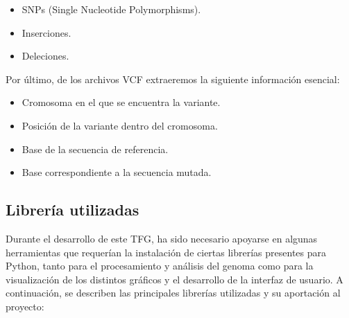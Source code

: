 \documentclass[11pt,spanish,listoffigures,listoftables]{tfgetsinf}
\begin{document}
\begin{itemize}
   \item SNPs (Single Nucleotide Polymorphisms). 
   \item Inserciones. 
   \item Deleciones.
\end{itemize}

Por último, de los archivos VCF extraeremos la siguiente información esencial: 

\begin{itemize}
   \item Cromosoma en el que se encuentra la variante.
   \item Posición de la variante dentro del cromosoma.  
   \item Base de la secuencia de referencia.
   \item Base correspondiente a la secuencia mutada.
\end{itemize}
 

\subsection{Librería utilizadas}

Durante el desarrollo de este TFG, ha sido necesario apoyarse en algunas herramientas que requerían la instalación de ciertas librerías presentes para Python, tanto para el procesamiento y análisis del genoma como para la visualización de los distintos gráficos y el desarrollo de la interfaz de usuario. A continuación, se describen las principales librerías utilizadas y su aportación al proyecto:
\end{document}
